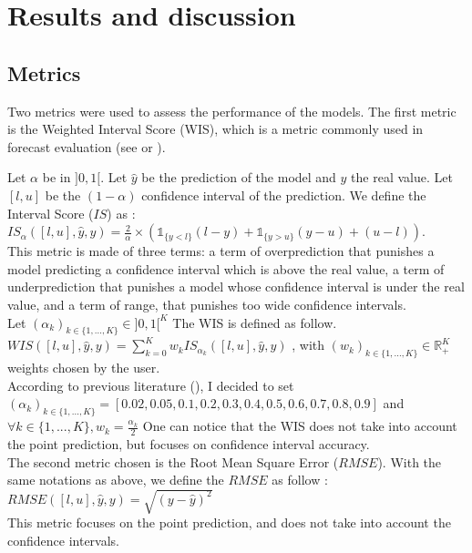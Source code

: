 \section{Results and discussion}


\subsection*{Metrics}
\label{sec:metrics}
Two metrics were used to assess the performance of the models. 
The first metric is the Weighted Interval Score (WIS), which is a metric commonly used in forecast evaluation (see \cite{cramer2022evaluation} or \cite{paireau2022ensemble}). 

Let $\alpha$ be in $]0, 1[$. Let $\hat{y}$ be the prediction of the model and $y$ the real value.
Let $[l, u]$ be the $(1-\alpha)$ confidence interval of the prediction.
We define the Interval Score ($IS$) as : \\
$IS_\alpha( [l, u], \hat{y}, y ) = \frac{2}{\alpha} \times ( \mathbb{1}_{\{y<l\}} (l-y) + \mathbb{1}_{\{y>u\}} (y-u) + (u-l))$. \\
This metric is made of three terms: a term of overprediction that punishes a model predicting a confidence interval which is above the real value, a term of underprediction that punishes a model whose confidence interval is under the real value, and a term of range, that punishes too wide confidence intervals. \\
Let $(\alpha_k)_{k \in \{1, \dots , K\}} \in ] 0 , 1 [ ^K $
The WIS is defined as follow. \\

$WIS( [l, u], \hat{y}, y ) = \sum_{k=0}^{K} w_k IS_{\alpha_k}( [l, u], \hat{y}, y ) $ , with $(w_k)_{k \in \{1, ... , K\}} \in \mathbb{R}_+ ^K $ weights chosen by the user. \\

According to previous literature (\cite{cramer2022evaluation}), I decided to set \\
$(\alpha_k)_{k \in \{1, ... , K\}} = [0.02, 0.05, 0.1, 0.2, 0.3, 0.4, 0.5, 0.6, 0.7, 0.8, 0.9]$ and $ \forall k \in  \{1, ... , K\}, w_k = \frac{\alpha_k}{2}$
One can notice that the WIS does not take into account the point prediction, but focuses on confidence interval accuracy. \\

The second metric chosen is the Root Mean Square Error ($RMSE$). 
With the same notations as above, we define the $RMSE$ as follow : \\
$RMSE([l, u], \hat{y}, y) = \sqrt{(y-\hat{y})^2}$\\
This metric focuses on the point prediction, and does not take into account the confidence intervals. 


